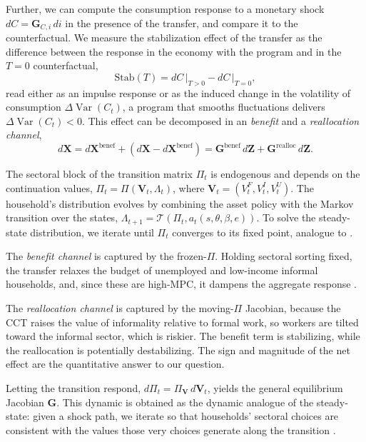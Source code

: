 \documentclass[12pt]{article}
\DeclareMathOperator{\Var}{Var}
\begin{document}
Further, we can compute the consumption response to a monetary shock
$dC = \textbf{G}_{C,i} \, di$ in the presence of the transfer, and compare it to the
counterfactual. We measure the stabilization effect of the transfer as the difference
between the response in the economy with the program and in the $T=0$ counterfactual,
\[
\text{Stab}(T) = dC \, \big|_{T>0} - dC \, \big|_{T=0},
\]
read either as an impulse response or as the induced change in the volatility of
consumption $\Delta \!\Var(C_t)$, a program that smooths fluctuations delivers
$\Delta \!\Var(C_t) < 0$. This effect can be decomposed in an \textit{benefit} and
a \textit{reallocation channel},
\[
d\textbf{X} = d\textbf{X}^\text{benef}
+ \left( d\textbf{X} - d\textbf{X}^\text{benef} \right)
= \textbf{G}^\text{benef} \, d\textbf{Z} + \textbf{G}^\text{realloc} \, d\textbf{Z}.
\]

The sectoral block of the transition matrix $\Pi_t$ is endogenous and depends on the
continuation values, $\Pi_t = \Pi(\textbf{V}_t, \Lambda_t)$, where
$\textbf{V}_t = (V_t^F, V_t^I, V_t^U)$. The household's distribution evolves by
combining the asset policy with the Markov transition over the states,
$\Lambda_{t+1} = \mathcal{T} \!\left( \Pi_t, a_t(s,\theta,\beta,e) \right)$. To solve
the steady-state distribution, we iterate until $\Pi_t$ converges to its fixed point,
analogue to \textcite{aguirregabiria2007sequential}.

The \textit{benefit channel} is captured by the frozen-$\Pi$. Holding sectoral sorting
fixed, the transfer relaxes the budget of unemployed and low-income informal households,
and, since these are high-MPC, it dampens the aggregate response
\parencite{auclert2024intertemporal}.

The \textit{reallocation channel} is captured by the moving-$\Pi$ Jacobian, because the
CCT raises the value of informality relative to formal work, so workers are tilted toward
the informal sector, which is riskier. The benefit term is stabilizing, while the
reallocation is potentially destabilizing. The sign and magnitude of the net effect are
the quantitative answer to our question.

Letting the transition respond, $d\Pi_t = \Pi_{\textbf{V}} \, d\textbf{V}_t$, yields the
general equilibrium Jacobian $\textbf{G}$. This dynamic is obtained as the dynamic
analogue of the steady-state: given a shock path, we iterate so that households'
sectoral choices are consistent with the values those very choices generate along the
transition \parencite{auclert2021using}.
\end{document}
